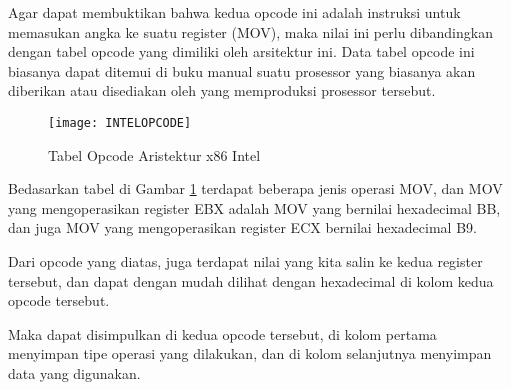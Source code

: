 Agar dapat membuktikan bahwa kedua opcode ini adalah instruksi untuk
memasukan angka ke suatu register (MOV), maka nilai ini perlu dibandingkan
dengan tabel opcode yang dimiliki oleh arsitektur ini. Data tabel opcode
ini biasanya dapat ditemui di buku manual suatu prosessor yang biasanya
akan diberikan atau disediakan oleh yang memproduksi prosessor tersebut.

\begin{figure}[h]
    \centering
    \texttt{[image: INTELOPCODE]}
    \caption{Tabel Opcode Aristektur x86 Intel}
    \label{fig:INTELOPCODE}
\end{figure}

Bedasarkan tabel di Gambar \ref{fig:INTELOPCODE} terdapat beberapa jenis operasi MOV,
dan MOV yang mengoperasikan register EBX adalah MOV yang bernilai hexadecimal BB, dan juga
MOV yang mengoperasikan register ECX bernilai hexadecimal B9.

Dari opcode yang diatas, juga terdapat nilai yang kita salin ke kedua register tersebut,
dan dapat dengan mudah dilihat dengan hexadecimal di kolom kedua opcode tersebut.

Maka dapat disimpulkan di kedua opcode tersebut, di kolom pertama menyimpan
tipe operasi yang dilakukan, dan di kolom selanjutnya menyimpan data yang digunakan.
